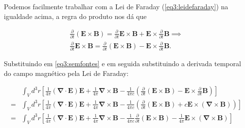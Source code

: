Podemos facilmente trabalhar com a Lei de Faraday (\ref{eq3:leidefaraday}) na igualdade acima, a regra do produto nos dá que

\begin{equation}
	\begin{split}
		\frac{\partial}{\partial t}\left( \textbf{E} \times \textbf{B}\right) = \frac{\partial}{\partial t}\textbf{E} \times \textbf{B} + \textbf{E} \times \frac{\partial}{\partial t}\textbf{B} \implies \\
		\frac{\partial}{\partial t}\textbf{E} \times \textbf{B} = \frac{\partial}{\partial t}\left( \textbf{E} \times \textbf{B}\right) - \textbf{E} \times \frac{\partial}{\partial t}\textbf{B}.
	\end{split}
\end{equation}

Substituindo em \ref{eq3:semfontes} e em seguida substituindo a derivada temporal do campo magnético pela Lei de Faraday:

\begin{equation}
	\begin{split}
		& \int_V d^3 r \left[ \frac{1}{4\pi}\left( \mathbf{\nabla} \cdot \textbf{E}\right)  \textbf{E} + \frac{1}{4\pi} \mathbf{\nabla} \times \textbf{B} - \frac{1}{4\pi c} \left(\frac{\partial}{\partial t}\left( \textbf{E} \times \textbf{B}\right) - \textbf{E} \times \frac{\partial}{\partial t}\textbf{B}\right) \right]\\
		= & \int_V d^3 r \left[ \frac{1}{4\pi}\left( \mathbf{\nabla} \cdot \textbf{E}\right)  \textbf{E} + \frac{1}{4\pi} \mathbf{\nabla} \times \textbf{B} - \frac{1}{4\pi c} \left(\frac{\partial}{\partial t}\left( \textbf{E} \times \textbf{B}\right) + c\textbf{E} \times (\mathbf{\nabla} \times \textbf{B})\right)\right] \\
		= & \int_V d^3 r \left[ \frac{1}{4\pi}\left( \mathbf{\nabla} \cdot \textbf{E}\right)  \textbf{E} + \frac{1}{4\pi} \mathbf{\nabla} \times \textbf{B} - \frac{1}{4\pi c} \frac{\partial}{\partial t}\left( \textbf{E} \times \textbf{B}\right) - \frac{1}{4\pi }\textbf{E} \times (\mathbf{\nabla} \times \textbf{B})\right]
	\end{split}
\end{equation}